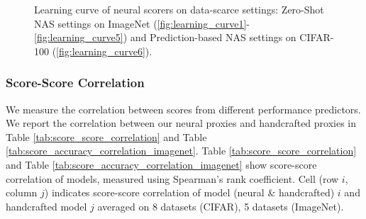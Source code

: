 \documentclass[lettersize,journal]{IEEEtran}
\begin{document}
          \begin{figure*}
            \centering
            
            \hfill
            \hfill
            
            \vspace{1cm} 

            \hfill
            \hfill
            
             \caption{Learning curve of neural scorers on data-scarce settings: Zero-Shot NAS settings on ImageNet (\ref{fig:learning_curve1}-\ref{fig:learning_curve5}) and Prediction-based NAS settings on CIFAR-100 (\ref{fig:learning_curve6}).}
            \label{fig:learning_curve}
        \end{figure*}












        \subsubsection{Score-Score Correlation}
            We measure the correlation between scores from different performance predictors. We report the correlation between our neural proxies and handcrafted proxies in Table \ref{tab:score_score_correlation} and Table \ref{tab:score_accuracy_correlation_imagenet}. Table \ref{tab:score_score_correlation} and Table \ref{tab:score_accuracy_correlation_imagenet} show score-score correlation of models, measured using Spearman's rank coefficient. Cell (row $i$, column $j$) indicates score-score correlation of model (neural \& handcrafted) $i$ and handcrafted model $j$ averaged on 8 datasets (CIFAR), 5 datasets (ImageNet).
            
\end{document}
